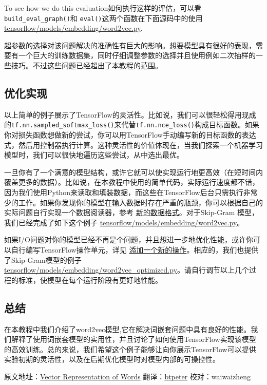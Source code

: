 To see how we do this
evaluation如何执行这样的评估，可以看\texttt{build\_eval\_graph()}和
\texttt{eval()}这两个函数在下面源码中的使用
\href{https://tensorflow.googlesource.com/tensorflow/+/master/tensorflow/models/embedding/word2vec.py}{tensorflow/models/embedding/word2vec.py}.

超参数的选择对该问题解决的准确性有巨大的影响。想要模型具有很好的表现，需要有一个巨大的训练数据集，同时仔细调整参数的选择并且使用例如二次抽样的一些技巧。不过这些问题已经超出了本教程的范围。

\subsection{优化实现 }\label{ux4f18ux5316ux5b9eux73b0}

以上简单的例子展示了TensorFlow的灵活性。比如说，我们可以很轻松得用现成的\texttt{tf.nn.sampled\_softmax\_loss()}来代替\texttt{tf.nn.nce\_loss()}构成目标函数。如果你对损失函数想做新的尝试，你可以用TensorFlow手动编写新的目标函数的表达式，然后用控制器执行计算。这种灵活性的价值体现在，当我们探索一个机器学习模型时，我们可以很快地遍历这些尝试，从中选出最优。

一旦你有了一个满意的模型结构，或许它就可以使实现运行地更高效（在短时间内覆盖更多的数据）。比如说，在本教程中使用的简单代码，实际运行速度都不错，因为我们使用Python来读取和填装数据，而这些在TensorFlow后台只需执行非常少的工作。如果你发现你的模型在输入数据时存在严重的瓶颈，你可以根据自己的实际问题自行实现一个数据阅读器，参考
\href{tensorflow-zh/SOURCE/how_tos/new_data_formats/index.md}{新的数据格式}。对于Skip-Gram
模型，我们已经完成了如下这个例子
\href{https://tensorflow.googlesource.com/tensorflow/+/master/tensorflow/models/embedding/word2vec.py}{tensorflow/models/embedding/word2vec.py}。

如果I/O问题对你的模型已经不再是个问题，并且想进一步地优化性能，或许你可以自行编写TensorFlow操作单元，详见
\href{tensorflow-zh/SOURCE/how_tos/adding_an_op/index.md}{添加一个新的操作}。相应的，我们也提供了Skip-Gram模型的例子
\href{https://tensorflow.googlesource.com/tensorflow/+/master/tensorflow/models/embedding/word2vec_optimized.py}{tensorflow/models/embedding/word2vec\_optimized.py}。请自行调节以上几个过程的标准，使模型在每个运行阶段有更好地性能。

\subsection{总结 }\label{ux603bux7ed3}

在本教程中我们介绍了word2vec模型,它在解决词嵌套问题中具有良好的性能。我们解释了使用词嵌套模型的实用性，并且讨论了如何使用TensorFlow实现该模型的高效训练。总的来说，我们希望这个例子能够让向你展示TensorFlow可以提供实验初期的灵活性，以及在后期优化模型时对模型内部的可操控性。

原文地址：\href{https://github.com/tensorflow/tensorflow/blob/master/tensorflow/g3doc/tutorials/word2vec/index.md}{Vector
Representation of Words}
翻译：\href{https://github.com/btpeter}{btpeter} 校对：waiwaizheng



